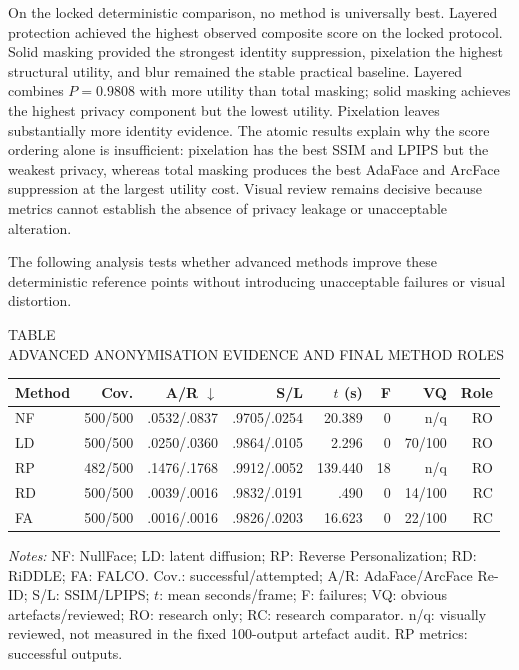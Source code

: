 \documentclass[10pt,twocolumn]{IEEEtran}
\begin{document}
On the locked deterministic comparison, no method is universally best. Layered
protection achieved the highest observed composite score on the locked
protocol. Solid masking provided the strongest identity suppression,
pixelation the highest structural utility, and blur remained the stable
practical baseline. Layered combines $P=0.9808$ with more
utility than total masking; solid masking achieves the highest privacy component
but the lowest utility. Pixelation leaves substantially more identity evidence.
The atomic results explain why the score ordering alone is
insufficient: pixelation has the best SSIM and LPIPS but the weakest privacy,
whereas total masking produces the best AdaFace and ArcFace suppression at the
largest utility cost. Visual review remains decisive because metrics cannot
establish the absence of privacy leakage or unacceptable alteration.

The following analysis tests whether advanced methods improve these
deterministic reference points without introducing unacceptable failures or
visual distortion.

\clearpage

\begin{strip}
\centering
{}\label{tab:rq2-advanced}
{\footnotesize TABLE~\thetable\\
ADVANCED ANONYMISATION EVIDENCE AND FINAL METHOD ROLES\par}
\vspace{4pt}
\fontsize{7.2}{8.7}\selectfont
\setlength{\tabcolsep}{3.2pt}
\renewcommand{\arraystretch}{1.20}
\begin{tabular*}{\textwidth}{@{\extracolsep{\fill}}lrrrrrrr@{}}
\hline
\textbf{Method} & \textbf{Cov.} & \textbf{A/R $\downarrow$} &
\textbf{S/L} & \textbf{$t$ (s)} & \textbf{F} & \textbf{VQ} & \textbf{Role} \\
\hline
NF & 500/500 & .0532/.0837 & .9705/.0254 & 20.389 & 0 & n/q & RO \\
LD & 500/500 & .0250/.0360 & .9864/.0105 & 2.296 & 0 & 70/100 & RO \\
RP & 482/500 & .1476/.1768 & .9912/.0052 & 139.440 & 18 & n/q & RO \\
RD & 500/500 & .0039/.0016 & .9832/.0191 & .490 & 0 & 14/100 & RC \\
FA & 500/500 & .0016/.0016 & .9826/.0203 & 16.623 & 0 & 22/100 & RC \\
\hline
\end{tabular*}
\vspace{5pt}

\raggedright\footnotesize \textit{Notes:} NF: NullFace; LD: latent diffusion;
RP: Reverse Personalization; RD: RiDDLE; FA: FALCO. Cov.: successful/attempted;
A/R: AdaFace/ArcFace Re-ID; S/L: SSIM/LPIPS; $t$: mean seconds/frame; F:
failures; VQ: obvious artefacts/reviewed; RO: research only; RC: research
comparator. n/q: visually reviewed, not measured in the
fixed 100-output artefact audit. RP metrics: successful outputs.
\end{strip}
\end{document}
